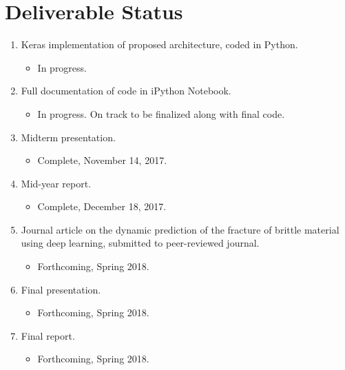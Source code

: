 \section{Deliverable Status}
\begin{enumerate}
\item Keras implementation of proposed architecture, coded in Python.
	\begin{itemize}
		\item In progress.
	\end{itemize} 
\item Full documentation of code in iPython Notebook.
	\begin{itemize}
		\item In progress. On track to be finalized along with final code.
	\end{itemize} 
\item Midterm presentation.
	\begin{itemize}
		\item Complete, November 14, 2017.
	\end{itemize} 
\item Mid-year report.
	\begin{itemize}
		\item Complete, December 18, 2017.
	\end{itemize} 
\item Journal article on the dynamic prediction of the fracture of brittle material using deep learning, submitted to peer-reviewed journal.
	\begin{itemize}
		\item Forthcoming, Spring 2018.
	\end{itemize} 
\item Final presentation.
	\begin{itemize}
		\item Forthcoming, Spring 2018.
	\end{itemize} 
\item Final report.
	\begin{itemize}
		\item Forthcoming, Spring 2018.
	\end{itemize} 
\end{enumerate}
\fi